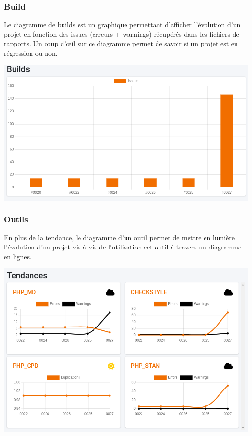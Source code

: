 			\subsubsection{Build}
				Le diagramme de builds est un graphique permettant d'afficher l'évolution d'un projet en fonction des issues (erreurs + warnings) récupérés dans les fichiers de rapports.
				Un coup d'œil sur ce diagramme permet de savoir si un projet est en régression ou non.
				\begin{center}
					\includegraphics[scale=0.4]{chap_4/graphique-build.png}
					\label{Graphique builds}
				\end{center}
			\subsubsection{Outils}
			En plus de la tendance, le diagramme d'un outil permet de mettre en lumière l'évolution d'un projet vis à vis de l'utilisation cet outil à travers un diagramme en lignes.
				\begin{center}
					\includegraphics[scale=0.5]{chap_4/tendance-outils.png}
					\label{Diagramme - outils}
				\end{center}
